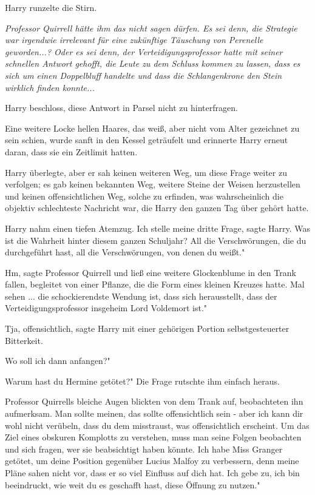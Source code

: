 Harry runzelte die Stirn.

\emph{Professor Quirrell hätte ihm das nicht sagen dürfen. Es sei denn, die
Strategie war irgendwie irrelevant für eine zukünftige Täuschung von Perenelle
geworden...? Oder es sei denn, der Verteidigungsprofessor hatte mit seiner
schnellen Antwort gehofft, die Leute zu dem Schluss kommen zu lassen, dass es
sich um einen Doppelbluff handelte und dass die Schlangenkrone den Stein
wirklich finden konnte...}

Harry beschloss, diese Antwort in Parsel nicht zu hinterfragen.

Eine weitere Locke hellen Haares, das weiß, aber nicht vom Alter gezeichnet zu
sein schien, wurde sanft in den Kessel geträufelt und erinnerte Harry erneut
daran, dass sie ein Zeitlimit hatten.

Harry überlegte, aber er sah keinen weiteren Weg, um diese Frage weiter zu
verfolgen; es gab keinen bekannten Weg, weitere Steine der Weisen herzustellen
und keinen offensichtlichen Weg, solche zu erfinden, was wahrscheinlich die
objektiv schlechteste Nachricht war, die Harry den ganzen Tag über gehört hatte.

Harry nahm einen tiefen Atemzug. \glqq{}Ich stelle meine dritte Frage\grqq{},
sagte Harry. \glqq{}Was ist die Wahrheit hinter diesem ganzen Schuljahr? All die
Verschwörungen, die du durchgeführt hast, all die Verschwörungen, von denen du
weißt."

\glqq{}Hm\grqq{}, sagte Professor Quirrell und ließ eine weitere Glockenblume in
den Trank fallen, begleitet von einer Pflanze, die die Form eines kleinen
Kreuzes hatte. \glqq{}Mal sehen ... die schockierendste Wendung ist, dass sich
herausstellt, dass der Verteidigungsprofessor insgeheim Lord Voldemort ist."

\glqq{}Tja, offensichtlich\grqq{}, sagte Harry mit einer gehörigen Portion
selbstgesteuerter Bitterkeit.

\glqq{}Wo soll ich dann anfangen?"

\glqq{}Warum hast du Hermine getötet?" Die Frage rutschte ihm einfach heraus.

Professor Quirrells bleiche Augen blickten von dem Trank auf, beobachteten ihn
aufmerksam. \glqq{}Man sollte meinen, das sollte offensichtlich sein - aber ich
kann dir wohl nicht verübeln, dass du dem misstraust, was offensichtlich
erscheint. Um das Ziel eines obskuren Komplotts zu verstehen, muss man seine
Folgen beobachten und sich fragen, wer sie beabsichtigt haben könnte. Ich habe
Miss Granger getötet, um deine Position gegenüber Lucius Malfoy zu verbessern,
denn meine Pläne sahen nicht vor, dass er so viel Einfluss auf dich hat. Ich
gebe zu, ich bin beeindruckt, wie weit du es geschafft hast, diese Öffnung zu
nutzen."

